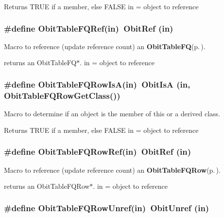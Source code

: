 Returns TRUE if a member, else FALSE in = object to reference 
\subsubsection{\setlength{\rightskip}{0pt plus 5cm}\#define Obit\-Table\-FQRef(in)\ Obit\-Ref (in)}\label{ObitTableFQ_8h_a2}


Macro to reference (update reference count) an {\bf Obit\-Table\-FQ}{\rm (p.\,\pageref{structObitTableFQ})}. 

returns an Obit\-Table\-FQ$\ast$. in = object to reference 
\subsubsection{\setlength{\rightskip}{0pt plus 5cm}\#define Obit\-Table\-FQRow\-Is\-A(in)\ Obit\-Is\-A (in, Obit\-Table\-FQRow\-Get\-Class())}\label{ObitTableFQ_8h_a6}


Macro to determine if an object is the member of this or a derived class. 

Returns TRUE if a member, else FALSE in = object to reference 
\subsubsection{\setlength{\rightskip}{0pt plus 5cm}\#define Obit\-Table\-FQRow\-Ref(in)\ Obit\-Ref (in)}\label{ObitTableFQ_8h_a5}


Macro to reference (update reference count) an {\bf Obit\-Table\-FQRow}{\rm (p.\,\pageref{structObitTableFQRow})}. 

returns an Obit\-Table\-FQRow$\ast$. in = object to reference 
\subsubsection{\setlength{\rightskip}{0pt plus 5cm}\#define Obit\-Table\-FQRow\-Unref(in)\ Obit\-Unref (in)}\label{ObitTableFQ_8h_a4}


